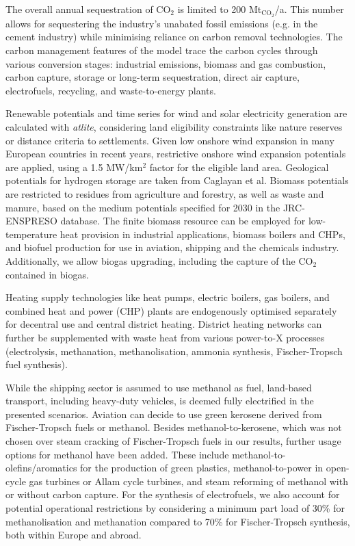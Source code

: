 The overall annual sequestration of CO$_2$ is limited to 200
Mt$_{\text{CO}_2}$/a. This number allows for sequestering the industry's
unabated fossil emissions (e.g. in the cement industry) while minimising
reliance on carbon removal technologies. The carbon management features of the
model trace the carbon cycles through various conversion stages: industrial
emissions, biomass and gas combustion, carbon capture, storage or long-term
sequestration, direct air capture, electrofuels, recycling, and waste-to-energy
plants.

Renewable potentials and time series for wind and solar electricity generation
are calculated with \textit{atlite},\cite{hofmannAtliteLightweight2021}
considering land eligibility constraints like nature reserves or distance
criteria to settlements. Given low onshore wind expansion in many European
countries in recent years,\cite{ourworldindataInstalledWind2023} restrictive
onshore wind expansion potentials are applied, using a 1.5 MW/km$^2$ factor for
the eligible land area. Geological potentials for hydrogen storage are taken
from Caglayan et al.\cite{caglayanTechnicalPotential2020} Biomass potentials are
restricted to residues from agriculture and forestry, as well as waste and
manure, based on the medium potentials specified for 2030 in the JRC-ENSPRESO
database.\cite{ruizENSPRESOOpen2019} The finite biomass resource can be employed
for low-temperature heat provision in industrial applications, biomass boilers
and CHPs, and biofuel production for use in aviation, shipping and the chemicals
industry. Additionally, we allow biogas upgrading, including the capture of the
CO$_2$ contained in biogas.

Heating supply technologies like heat pumps, electric boilers, gas boilers, and
combined heat and power (CHP) plants are endogenously optimised separately for
decentral use and central district heating. District heating networks can
further be supplemented with waste heat from various power-to-X processes
(electrolysis, methanation, methanolisation, ammonia synthesis, Fischer-Tropsch
fuel synthesis).

While the shipping sector is assumed to use methanol as fuel, land-based
transport, including heavy-duty vehicles, is deemed fully electrified in the
presented scenarios. Aviation can decide to use green kerosene derived from
Fischer-Tropsch fuels or methanol. Besides methanol-to-kerosene, which was not
chosen over steam cracking of Fischer-Tropsch fuels in our results, further
usage options for methanol have been added.
These include
methanol-to-olefins/aromatics for the production of green plastics,
methanol-to-power\cite{brownUltralongdurationEnergy2023} in open-cycle gas
turbines or Allam cycle turbines, and steam reforming of methanol with or
without carbon capture. For the synthesis of electrofuels, we also account for
potential operational restrictions by considering a minimum part load of 30\%
for methanolisation and methanation compared to 70\% for Fischer-Tropsch
synthesis, both within Europe and abroad.

